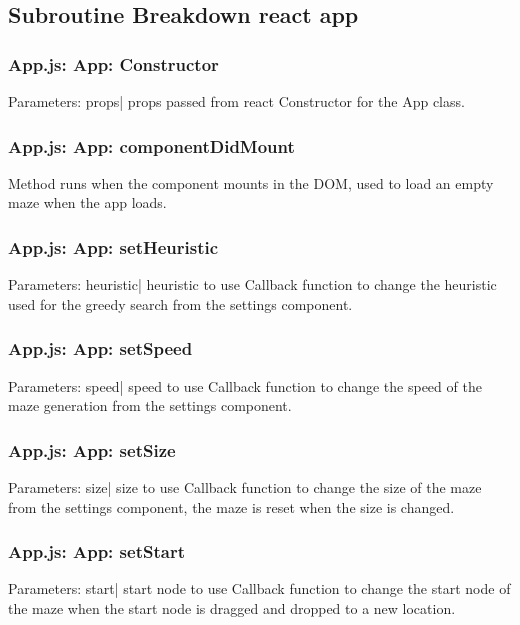 \documentclass[titlepage]{article}
\begin{document}
\subsection{Subroutine Breakdown react app}
\subsubsection{App.js: App: Constructor}
Parameters:\newline
\indent props| props passed from react\newline
Constructor for the App class.

\subsubsection{App.js: App: componentDidMount}
Method runs when the component mounts in the DOM, used to load an empty maze when the app loads.

\subsubsection{App.js: App: setHeuristic}
Parameters:\newline
\indent heuristic| heuristic to use\newline
Callback function to change the heuristic used for the greedy search from the settings component.

\subsubsection{App.js: App: setSpeed}
Parameters:\newline
\indent speed| speed to use\newline
Callback function to change the speed of the maze generation from the settings component.

\subsubsection{App.js: App: setSize}
Parameters:\newline
\indent size| size to use\newline
Callback function to change the size of the maze from the settings component, the maze is reset when the size is changed.

\subsubsection{App.js: App: setStart}
Parameters:\newline
\indent start| start node to use\newline
Callback function to change the start node of the maze when the start node is dragged and dropped to a new location.
\end{document}
